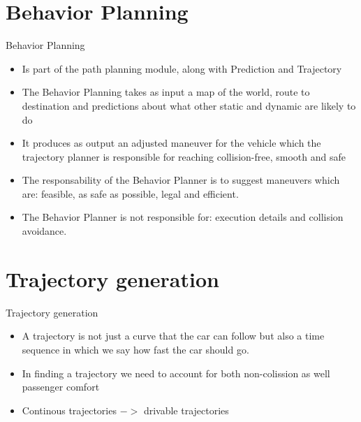 \documentclass[10pt,mathserif]{beamer}
\begin{document}
\section{Behavior Planning}
\begin{frame}{Behavior Planning}
\begin{itemize}
\item Is part of the path planning module, along with Prediction and Trajectory
\item The Behavior Planning takes as input a map of the world, route to destination and predictions
about what other static and dynamic are likely to do
\item It produces as output an adjusted maneuver for the vehicle which the trajectory planner is
responsible for reaching collision-free, smooth and safe
\item The responsability of the Behavior Planner is to suggest maneuvers which are: feasible, as safe
as possible, legal and efficient.
\item The Behavior Planner is not responsible for: execution details and collision avoidance. 
\end{itemize}
\end{frame}

\section{Trajectory generation}
\begin{frame}{Trajectory generation}
\begin{itemize}
\item A trajectory is not just a curve that the car can follow but also a time sequence in which we say
how fast the car should go.
\item In finding a trajectory we need to account for both non-colission as well passenger comfort
\item Continous trajectories $->$ drivable trajectories
\end{itemize}
\end{frame}
\end{document}
